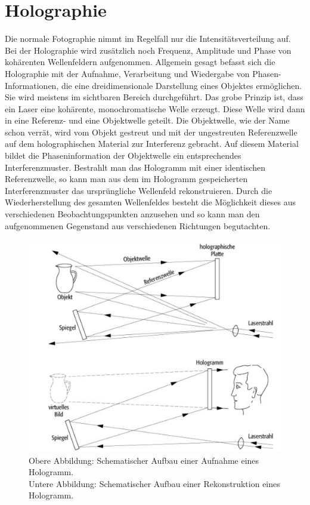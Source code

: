 \newpage
\section{Holographie}
Die normale Fotographie nimmt im Regelfall nur die Intensitätsverteilung auf. 
Bei der Holographie wird zusätzlich noch Frequenz, Amplitude und Phase von kohärenten Wellenfeldern aufgenommen.
Allgemein gesagt befasst sich die Holographie mit der Aufnahme, Verarbeitung und Wiedergabe von Phasen-Informationen, 
die eine dreidimensionale Darstellung eines Objektes ermöglichen. Sie wird meistens im sichtbaren Bereich durchgeführt.
Das grobe Prinzip ist, dass ein Laser eine kohärente, monochromatische Welle erzeugt. Diese Welle wird dann in eine 
 Referenz- und eine Objektwelle geteilt. 
Die Objektwelle, wie der Name schon verrät, wird vom Objekt gestreut 
und mit der ungestreuten Referenzwelle auf dem holographischen Material zur Interferenz gebracht. 
Auf diesem Material bildet die Phaseninformation der Objektwelle ein entsprechendes Interferenzmuster. 
Bestrahlt man das Hologramm mit einer identischen Referenzwelle, so kann man aus dem im Hologramm gespeicherten Interferenzmuster 
das ursprüngliche Wellenfeld rekonstruieren. 
Durch die Wiederherstellung des gesamten Wellenfeldes besteht die Möglichkeit dieses aus verschiedenen 
Beobachtungspunkten anzusehen und so kann man den aufgenommenen Gegenstand aus verschiedenen Richtungen begutachten. \citep[vgl.][]{holographie}
\begin{figure}[h]
    \centering
    \includegraphics[scale=0.5]{Bilder/FzV/Holographie.png}
    \caption{Obere Abbildung: Schematischer Aufbau einer Aufnahme eines Hologramm. \\
    Untere Abbildung: Schematischer Aufbau einer Rekonstruktion eines Hologramm.}
\end{figure}
